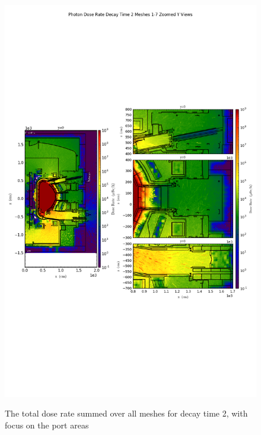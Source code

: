\documentclass[12pt]{article}
\begin{document}
\begin{figure}[ht!]
\centering
\includegraphics[trim={0cm 9cm 0cm 10cm},clip,scale=0.75]{../plots/final_model_nob4c/Photon_Dose_Rate_Decay_Time_2_Meshes_1-7_Zoomed_Y_Views.png}
\label{fig:photons_dc2_no4bc_total_zoomed}
\caption{The total dose rate summed over all meshes for decay time 2, with focus on the port areas}
\end{figure}
\end{document}
